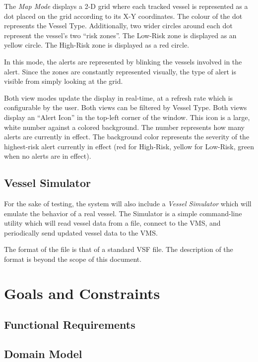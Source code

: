 \documentclass{article}
\begin{document}
The \emph{Map Mode} displays a 2-D grid where each tracked vessel is represented as a dot placed on the grid according to its X-Y coordinates. The colour of the dot represents the Vessel Type. Additionally, two wider circles around each dot represent the vessel's two ``risk zones''. The Low-Risk zone is displayed as an yellow circle. The High-Risk zone is displayed as a red circle.

In this mode, the alerts are represented by blinking the vessels involved in the alert. Since the zones are constantly represented visually, the type of alert is visible from simply looking at the grid.

Both view modes update the display in real-time, at a refresh rate which is configurable by the user. Both views can be filtered by Vessel Type. Both views display an ``Alert Icon'' in the top-left corner of the window. This icon is a large, white number against a colored background. The number represents how many alerts are currently in effect. The background color represents the severity of the highest-risk alert currently in effect (red for High-Risk, yellow for Low-Risk, green when no alerts are in effect).

\subsection{Vessel Simulator}

For the sake of testing, the system will also include a \emph{Vessel Simulator} which will emulate the behavior of a real vessel. The Simulator is a simple command-line utility which will read vessel data from a file, connect to the VMS, and periodically send updated vessel data to the VMS.

The format of the file is that of a standard VSF file. The description of the format is beyond the scope of this document.

\section{Goals and Constraints} %

\subsection{Functional Requirements} %

\subsection{Domain Model} %
\end{document}
